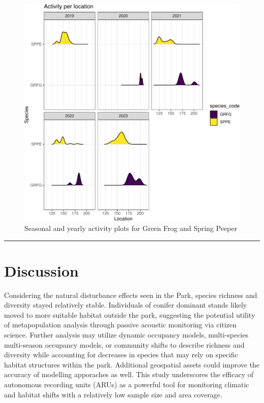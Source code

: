 \documentclass[
  letterpaper,
  DIV=11,
  numbers=noendperiod,
  oneside]{scrartcl}
\begin{document}
\begin{figure}

{\centering \includegraphics{peinp_files/figure-pdf/fig-spp-amphs-day-1.pdf}

}

\caption{\label{fig-spp-amphs-day}Seasonal and yearly activity plots for
Green Frog and Spring Peeper}

\end{figure}

\begin{center}\rule{0.5\linewidth}{0.5pt}\end{center}

\hypertarget{discussion}{%
\section{Discussion}\label{discussion}}

Considering the natural disturbance effects seen in the Park, species
richness and diversity stayed relatively stable. Individuals of conifer
dominant stands likely moved to more suitable habitat outside the park,
suggesting the potential utility of metapopulation analysis through
passive acoustic monitoring via citizen science. Further analysis may
utilize dynamic occupancy models, multi-species multi-season occupancy
models, or community shifts to describe richness and diversity while
accounting for decreases in species that may rely on specific habitat
structures within the park. Additional geospatial assets could improve
the accuracy of modelling apporaches as well. This study underscores the
efficacy of autonomous recording units (ARUs) as a powerful tool for
monitoring climatic and habitat shifts with a relatively low sample size
and area coverage.
\end{document}
